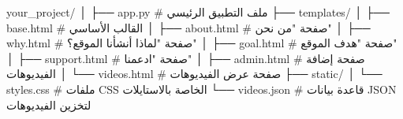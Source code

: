 your_project/
│
├── app.py               # ملف التطبيق الرئيسي
├── templates/
│   ├── base.html        # القالب الأساسي
│   ├── about.html       # صفحة "من نحن"
│   ├── why.html         # صفحة "لماذا أنشأنا الموقع؟"
│   ├── goal.html        # صفحة "هدف الموقع"
│   ├── support.html     # صفحة "ادعمنا"
│   ├── admin.html       # صفحة إضافة الفيديوهات
│   └── videos.html      # صفحة عرض الفيديوهات
├── static/
│   └── styles.css       # ملفات CSS الخاصة بالاستايلات
└── videos.json          # قاعدة بيانات JSON لتخزين الفيديوهات
